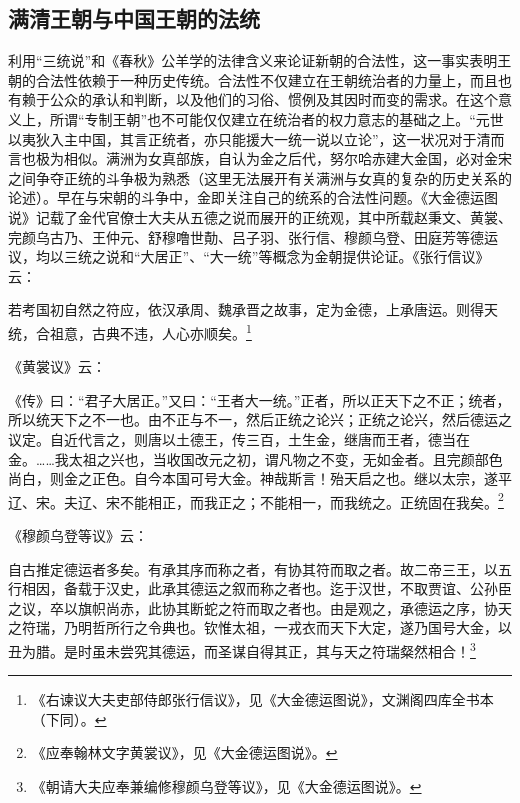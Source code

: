 \documentclass[a4paper, 12pt, openright]{ctexbook}
\renewenvironment{quote}
  {\list{}{\rightmargin2\ccwd \leftmargin2\ccwd \itemindent=2\ccwd \listparindent=2\ccwd}%
   \item\relax\small\kaishu\color{black}}
  {\endlist}
\begin{document}
\subsection{满清王朝与中国王朝的法统}

利用“三统说”和《春秋》公羊学的法律含义来论证新朝的合法性，这一事实表明王朝的合法性依赖于一种历史传统。合法性不仅建立在王朝统治者的力量上，而且也有赖于公众的承认和判断，以及他们的习俗、惯例及其因时而变的需求。在这个意义上，所谓“专制王朝”也不可能仅仅建立在统治者的权力意志的基础之上。“元世以夷狄入主中国，其言正统者，亦只能援大一统一说以立论”，这一状况对于清而言也极为相似。满洲为女真部族，自认为金之后代，努尔哈赤建大金国，必对金宋之间争夺正统的斗争极为熟悉（这里无法展开有关满洲与女真的复杂的历史关系的论述）。早在与宋朝的斗争中，金即关注自己的统系的合法性问题。《大金德运图说》记载了金代官僚士大夫从五德之说而展开的正统观，其中所载赵秉文、黄裳、完颜乌古乃、王仲元、舒穆噜世勣、吕子羽、张行信、穆颜乌登、田庭芳等德运议，均以三统之说和“大居正”、“大一统”等概念为金朝提供论证。《张行信议》云：

\begin{quote}
若考国初自然之符应，依汉承周、魏承晋之故事，定为金德，上承唐运。则得天统，合祖意，古典不违，人心亦顺矣。\footnote{《右谏议大夫吏部侍郎张行信议》，见《大金德运图说》，文渊阁四库全书本（下同）。}
\end{quote}

《黄裳议》云：

\begin{quote}
《传》曰：“君子大居正。”又曰：“王者大一统。”正者，所以正天下之不正；统者，所以统天下之不一也。由不正与不一，然后正统之论兴；正统之论兴，然后德运之议定。自近代言之，则唐以土德王，传三百，土生金，继唐而王者，德当在金。……我太祖之兴也，当收国改元之初，谓凡物之不变，无如金者。且完颜部色尚白，则金之正色。自今本国可号大金。神哉斯言！殆天启之也。继以太宗，遂平辽、宋。夫辽、宋不能相正，而我正之；不能相一，而我统之。正统固在我矣。\footnote{《应奉翰林文字黄裳议》，见《大金德运图说》。}
\end{quote}

《穆颜乌登等议》云：

\begin{quote}
自古推定德运者多矣。有承其序而称之者，有协其符而取之者。故二帝三王，以五行相因，备载于汉史，此承其德运之叙而称之者也。迄于汉世，不取贾谊、公孙臣之议，卒以旗帜尚赤，此协其断蛇之符而取之者也。由是观之，承德运之序，协天之符瑞，乃明哲所行之令典也。钦惟太祖，一戎衣而天下大定，遂乃国号大金，以丑为腊。是时虽未尝究其德运，而圣谋自得其正，其与天之符瑞粲然相合！\footnote{《朝请大夫应奉兼编修穆颜乌登等议》，见《大金德运图说》。}
\end{quote}
\end{document}
